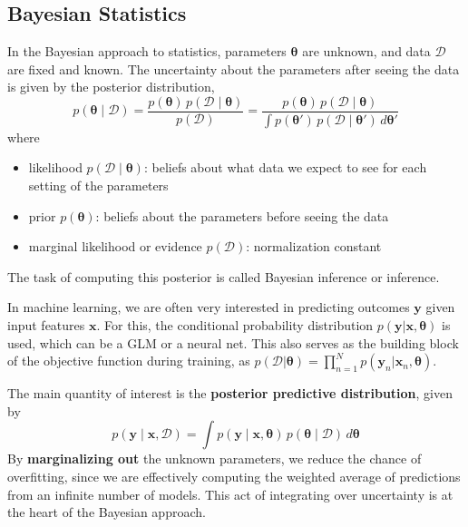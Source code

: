 \documentclass[11pt]{article}
\begin{document}
\subsection{Bayesian Statistics}
In the Bayesian approach to statistics, parameters $\boldsymbol{\theta}$ are unknown, and data $\mathcal{D}$ are fixed and known.
The uncertainty about the parameters after seeing the data is given by the posterior distribution,
\[
p(\boldsymbol{\theta} \mid \mathcal{D}) = \frac{p(\boldsymbol{\theta})\, p(\mathcal{D} \mid \boldsymbol{\theta})}{p(\mathcal{D})} = \frac{p(\boldsymbol{\theta})\, p(\mathcal{D} \mid \boldsymbol{\theta})}{\int p(\boldsymbol{\theta}')\, p(\mathcal{D} \mid \boldsymbol{\theta}')\, d\boldsymbol{\theta}'}
\]
where
\begin{itemize}
    \item likelihood $p(\mathcal{D} \mid \boldsymbol{\theta})$: beliefs about what data we expect to see for each setting of the parameters
    \item prior $p(\boldsymbol{\theta})$: beliefs about the parameters before seeing the data
    \item marginal likelihood or evidence $p(\mathcal{D})$: normalization constant
\end{itemize}
The task of computing this posterior is called Bayesian inference or inference.

In machine learning, we are often very interested in predicting outcomes $\boldsymbol{y}$ given input features $\boldsymbol{x}$.
For this, the conditional probability distribution $p(\boldsymbol{y} | \boldsymbol{x}, \boldsymbol{\theta})$ is used, which can be a GLM or a neural net.
This also serves as the building block of the objective function during training, as $p(\mathcal{D} | \boldsymbol{\theta}) = \prod_{n=1}^{N} p(\boldsymbol{y}_n | \boldsymbol{x}_n, \boldsymbol{\theta})$.

The main quantity of interest is the \textbf{posterior predictive distribution}, given by
\[
p(\boldsymbol{y} \mid \boldsymbol{x}, \mathcal{D}) = \int p(\boldsymbol{y} \mid \boldsymbol{x}, \boldsymbol{\theta})\, p(\boldsymbol{\theta} \mid \mathcal{D})\, d\boldsymbol{\theta}
\]
By \textbf{marginalizing out} the unknown parameters, we reduce the chance of overfitting, since we are effectively computing the weighted average of predictions from an infinite number of models. 
This act of integrating over uncertainty is at the heart of the Bayesian approach.
\end{document}
